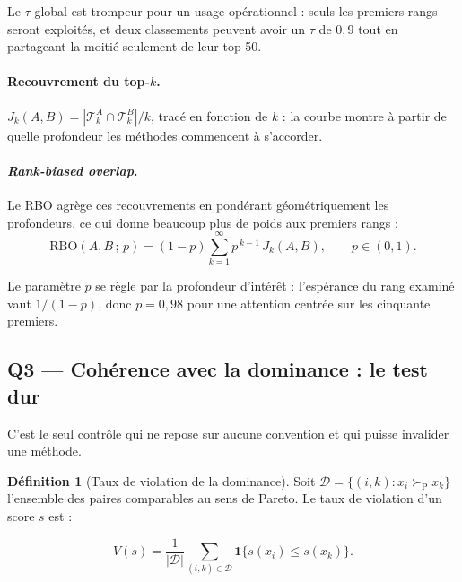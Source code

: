 \documentclass[11pt,a4paper]{article}
\theoremstyle{definition}
\newtheorem{definition}{Définition}[section]
\theoremstyle{remark}
\newcommand{\abs}[1]{\left\lvert #1 \right\rvert}
\newcommand{\ind}[1]{\mathbf{1}\{#1\}}
\newcommand{\pareto}{\succ_{\mathrm{P}}}
\begin{document}
\medskip

Le $\tau$ global est trompeur pour un usage opérationnel : seuls les premiers rangs seront
exploités, et deux classements peuvent avoir un $\tau$ de $0{,}9$ tout en partageant la moitié
seulement de leur top 50.

\medskip

\paragraph{Recouvrement du top-$k$.} $J_k(A,B) = \abs{\mathcal{T}^{A}_k \cap \mathcal{T}^{B}_k}/k$,
tracé en fonction de $k$ : la courbe montre à partir de quelle profondeur les méthodes commencent
à s'accorder.

\medskip

\paragraph{\emph{Rank-biased overlap}.} Le RBO agrège ces recouvrements en pondérant
géométriquement les profondeurs, ce qui donne beaucoup plus de poids aux premiers rangs :
\[
\mathrm{RBO}(A,B\,;\,p) = (1-p)\sum_{k=1}^{\infty} p^{\,k-1}\, J_k(A,B),
\qquad p \in (0,1).
\]

\bigskip

Le paramètre $p$ se règle par la profondeur d'intérêt : l'espérance du rang examiné vaut
$1/(1-p)$, donc $p = 0{,}98$ pour une attention centrée sur les cinquante premiers.

\bigskip

\subsection{Q3 --- Cohérence avec la dominance : le test dur}
\label{sec:violation}

\medskip

C'est le seul contrôle qui ne repose sur aucune convention et qui puisse invalider une méthode.

\medskip

\begin{definition}[Taux de violation de la dominance]
  Soit $\mathcal{D} = \{(i,k) : x_i \pareto x_k\}$ l'ensemble des paires comparables au sens de
  Pareto. Le taux de violation d'un score $s$ est :

  \medskip

  \[
  V(s) = \frac{1}{\abs{\mathcal{D}}}
  \sum_{(i,k)\in\mathcal{D}} \ind{s(x_i) \le s(x_k)}.
  \]
\end{definition}
\end{document}
